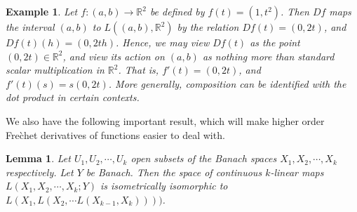 \documentclass[12pt,reqno]{amsart}
\numberwithin{equation}{section}  %
\newcommand{\rr}{\mathbb{R}}
\newtheorem{lemma}[theorem]{Lemma}
\newtheorem {example}[theorem]{Example}
\begin{document}
\begin{framed}
\begin{example}
Let $f: (a,b) \to \rr^2$ be defined by $f(t) = (1, t^2)$. Then $Df$ maps the
interval $(a,b)$ to $L((a,b), \rr^{2})$ by the relation $Df(t) = (0, 2t)$, and
$Df(t)(h) = (0,2th)$. Hence, we may view $Df(t)$ as the point $(0,2t) \in
\rr^2$, and view its action on $(a,b)$ as nothing more than standard scalar
multiplication in $\rr^{2}$. That is, $f'(t) = (0,2t)$, and $f'(t)(s) = s(0,
2t)$. More generally, composition can be \emph{identified} with the dot product in certain contexts. 
\end{example}
\end{framed}
We also have the following important result, which will make higher order
Fre\`chet derivatives of functions easier to deal with.
%
%
%
%
%
%
%
%
\begin{lemma}
Let $U_{1}, U_{2}, \cdots,
U_{k}$ open subsets of the Banach spaces $X_{1}, X_{2}, \cdots, X_{k}$
respectively. Let $Y$ be Banach. 
Then the space of continuous $k$-linear maps $L(X_{1}, X_{2}, \cdots, X_{k};
Y)$ is isometrically isomorphic to $L(X_{1}, L(X_{2}, \cdots L(X_{k-1},
X_{k}))))$.
\label{lem:iso}
\end{lemma}
%
%
%
\end{document}

